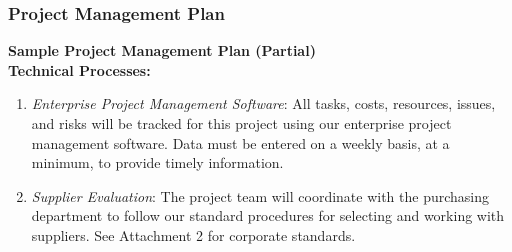 \documentclass{beamer}
\begin{document}
\begin{frame}
\frametitle{Project Management Plan}
\textbf{Sample Project Management Plan (Partial)}\\
\vspace{0.5cm}
\small
\textbf{Technical Processes:}
\begin{enumerate}
\item \textit{Enterprise Project Management Software}: All tasks, costs, resources, issues, and risks will be tracked for this project using our enterprise project management software. Data must be entered on a weekly basis, at a minimum, to provide timely information. 
\item \textit{Supplier Evaluation}: The project team will coordinate with the purchasing department to follow our standard procedures for selecting and working with suppliers. See Attachment 2 for corporate standards.
\end{enumerate}
\end{frame}

\end{document}
